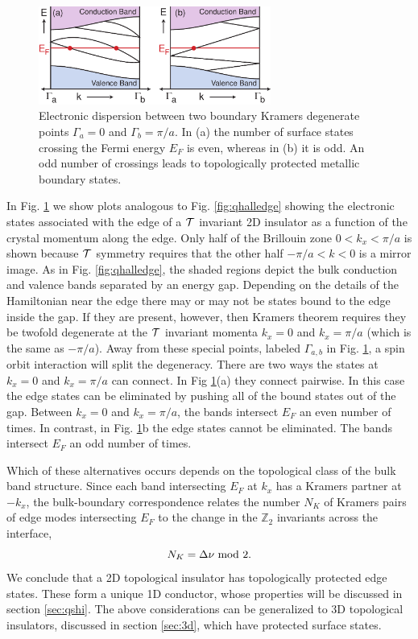 \documentclass[twocolumn,floatfix,showpacs,rmp,aps]{revtex4}
\begin{document}
	\begin{figure}
		\includegraphics[width=3in]{Fig3}
		\caption{Electronic dispersion between two boundary Kramers degenerate points
			$\Gamma_a=0$ and $\Gamma_b=\pi/a$.  In (a) the number of surface states crossing the Fermi
			energy $E_F$ is even, whereas in (b) it is odd.
			An odd number of crossings leads to topologically protected metallic boundary states.}
		\label{fig:zigzag}
	\end{figure}
	
	In Fig. \ref{fig:zigzag} we show plots analogous to Fig. \ref{fig:qhalledge} showing the electronic
	states associated with the edge of a ${\cal T}$ invariant 2D
	insulator as a function of the crystal momentum along the edge.  Only
	half of the Brillouin zone $0<k_x<\pi/a$ is shown because ${\cal T}$
	symmetry requires that the other
	half $-\pi/a<k<0$ is a mirror image.  As in Fig. \ref{fig:qhalledge}, the
	shaded regions depict the bulk conduction and valence bands separated by an
	energy gap.  Depending on the details of the Hamiltonian near the
	edge there may or may not be states bound to the edge inside the gap.
	If they are present, however, then Kramers
	theorem requires they be twofold degenerate at the ${\cal T}$
	invariant momenta $k_x=0$ and $k_x=\pi/a$ (which is the same as
	$-\pi/a$). Away from these special points, labeled $\Gamma_{a,b}$ in
	Fig. \ref{fig:zigzag}, a spin orbit
	interaction will split the degeneracy.  There are two
	ways the states at $k_x=0$ and $k_x=\pi/a$ can connect.  In
	Fig \ref{fig:zigzag}(a) they connect pairwise.  In this case
	the edge states can be eliminated by pushing all of the bound
	states out of the gap. Between $k_x=0$ and $k_x=\pi/a$, the bands intersect
	$E_F$ an even number of times. In contrast, in Fig. \ref{fig:zigzag}b the
	edge states cannot be eliminated.  The bands intersect $E_F$
	an odd number of times.
	
	Which of these alternatives occurs depends on
	the topological class of the bulk band structure.  Since each band intersecting
	$E_F$ at $k_x$ has a Kramers partner at $-k_x$, the bulk-boundary
	correspondence relates the number $N_K$ of Kramers pairs of edge
	modes intersecting $E_F$ to the change in the $\mathbb{Z}_2$
	invariants across the interface,
	\begin{equation}
		N_K = \Delta \nu \ {\rm mod} \ 2.
	\end{equation}
	We conclude that a 2D topological insulator has
	topologically protected edge states.  These form a unique
	1D conductor, whose properties will be discussed in section
	\ref{sec:qshi}.  The above considerations can be generalized to
	3D topological insulators, discussed in section \ref{sec:3d},
	which have protected surface states.
	
\end{document}
